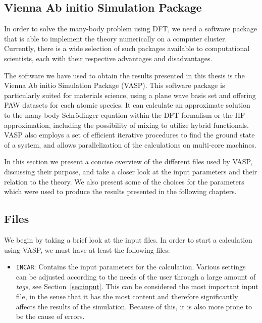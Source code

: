 \begin{refsection}

\chapter{Vienna Ab initio Simulation Package} \label{appendix:sec-VASP}

In order to solve the many-body problem using DFT, we need a software package that is able to implement the theory numerically on a computer cluster. Currently, there is a wide selection of such packages available to computational scientists, each with their respective advantages and disadvantages.

The software we have used to obtain the results presented in this thesis is the Vienna Ab initio Simulation Package (VASP)\cite{vasp}. This software package is particularly suited for materials science, using a plane wave basis set and offering PAW datasets for each atomic species. It can calculate an approximate solution to the many-body Schr\"odinger equation within the DFT formalism or the HF approximation, including the possibility of mixing to utilize hybrid functionals. VASP also employs a set of efficient iterative procedures to find the ground state of a system, and allows parallelization of the calculations on multi-core machines.

In this section we present a concise overview of the different files used by VASP, discussing their purpose, and take a closer look at the input parameters and their relation to the theory. We also present some of the choices for the parameters which were used to produce the results presented in the following chapters.

\section{Files}

We begin by taking a brief look at the input files. In order to start a calculation using VASP, we must have at least the following files:

\begin{itemize}

 \label{appendix:sec-INCAR}
\item \texttt{INCAR}: Contains the input parameters for the calculation. Various settings can be adjusted according to the needs of the user through a large amount of \textit{tags}, see Section~\ref{sec:input}. This can be considered the most important input file, in the sense that it has the most content and therefore significantly affects the results of the simulation. Because of this, it is also more prone to be the cause of errors. 


\end{itemize}
\end{refsection}
